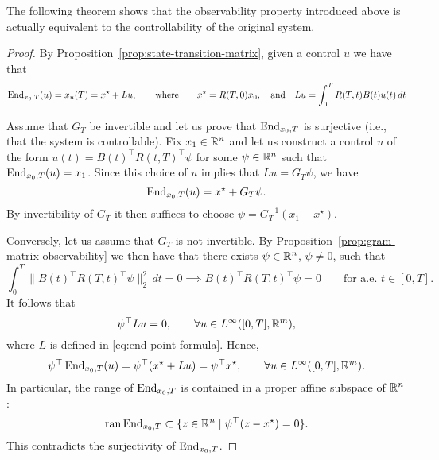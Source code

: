The following theorem shows that the observability property introduced above is actually equivalent to the controllability of the original system.


\begin{proof}
    By Proposition~\ref{prop:state-transition-matrix}, given a control $u$ we have that
    \begin{equation}
        \label{eq:end-point-formula}
        \operatorname{End}_{x_0,T}(u) = x_u(T) = x^\star + Lu,
        \qquad \text{where}\qquad
        x^\star = R(T,0)x_0,
        \quad\text{and}\quad
        Lu = \int_0^T R(T,t)B(t)u(t)\, dt
    \end{equation}


    Assume that $G_T$ be invertible and let us prove that $\operatorname{End}_{x_0,T}$ is surjective (i.e., that the system is controllable).
    Fix $x_1\in \mathbb{R}^n$ and let us construct a control $u$  of the form $u(t) = B(t)^\top R(t,T)^\top \psi$ for some $\psi\in \mathbb{R}^n$ such that $\operatorname{End}_{x_0,T}(u)=x_1$.
    Since this choice of $u$ implies that $Lu = G_T\psi$, we have
    \begin{equation}
        \operatorname{End}_{x_0,T}(u) = x^\star + G_T \psi.
    \end{equation}
    By invertibility of $G_T$ it then suffices to choose $\psi = G^{-1}_T (x_1-x^\star)$.

    Conversely, let us assume that $G_T$ is not invertible. By Proposition~\ref{prop:gram-matrix-observability} we then have that there exists $\psi\in \mathbb{R}^n$, $\psi\neq 0$, such that
    \begin{equation}
        \int_0^T \|B(t)^\top R(T,t)^\top \psi\|_2^2 \, dt = 0
        \implies
        B(t)^\top R(T,t)^\top \psi = 0 \qquad \text{for a.e.\ } t\in [0,T].
    \end{equation}
    It follows that
    \begin{equation}
        \psi^\top Lu = 0,
        \qquad \forall u\in L^\infty([0,T],\mathbb{R}^m),
    \end{equation}
    where $L$ is defined in \eqref{eq:end-point-formula}.
    Hence,
    \begin{equation}
        \psi^\top \operatorname{End}_{x_0,T}(u) = \psi^\top (x^\star + Lu) = \psi^\top x^\star, \qquad \forall u \in L^\infty([0,T],\mathbb{R}^m).
    \end{equation}
    In particular, the range of $\operatorname{End}_{x_0,T}$ is contained in a proper affine subspace of $\mathbb{R}^n$:
    \begin{equation}
        \operatorname{ran}\operatorname{End}_{x_0,T} \subset \{ z \in \mathbb{R}^n\mid \psi^\top (z-x^\star) = 0\}.
    \end{equation}
    This contradicts the surjectivity of $\operatorname{End}_{x_0,T}$.
\end{proof}

